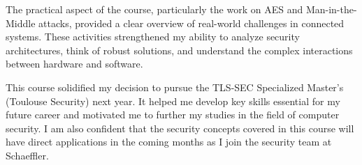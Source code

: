 \noindent The practical aspect of the course, particularly the work on AES and Man-in-the-Middle attacks, provided a clear overview of real-world challenges in connected systems. These activities strengthened my ability to analyze security architectures, think of robust solutions, and understand the complex interactions between hardware and software.
\vspace{0.25cm}

\noindent This course solidified my decision to pursue the TLS-SEC Specialized Master's (Toulouse Security) next year. It helped me develop key skills essential for my future career and motivated me to further my studies in the field of computer security. I am also confident that the security concepts covered in this course will have direct applications in the coming months as I join the security team at Schaeffler.
